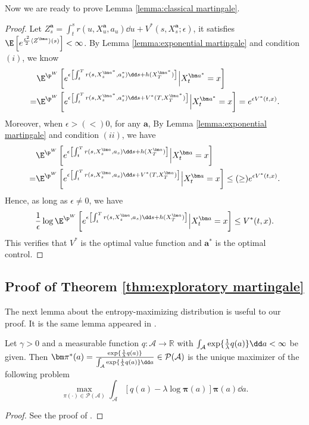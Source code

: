 Now we are ready to prove Lemma \ref{lemma:classical martingale}.
\begin{proof}
Let $Z_s^{\bm a} = \int_t^s r(u, X_{u}^{\bm a}, a_{u})\dd u+ V^*(s, X_s^{\bm a};\epsilon)$, it satisfies $\E\left[ e^{\frac{\epsilon^2}{2} \langle Z^{\bm a} \rangle(s) } \right] < \infty$. By Lemma \ref{lemma:exponential martingale} and condition $(i)$, we know
\[
\begin{aligned}
& \E^{\p^W}\left[ e^{\epsilon \left[\int_t^T r(s,X_s^{\bm a^*},a_s^*) \dd s + h(X_T^{\bm a^*}) \right]}   \Big| X_t^{\bm a^*} = x \right] \\
= & \E^{\p^W}\left[ e^{\epsilon \left[\int_t^T r(s,X_s^{\bm a^*},a_s^*) \dd s + V^*(T,X_T^{\bm a^*}) \right]}   \Big| X_t^{\bm a^*} = x \right] = e^{\epsilon V^*(t,x)}.
\end{aligned}
\]
Moreover, when $\epsilon > (<) 0$, for any $\bm a$, By Lemma \ref{lemma:exponential martingale} and condition $(ii)$, we have 
\[
\begin{aligned}
& \E^{\p^W}\left[ e^{\epsilon \left[\int_t^T r(s,X_s^{\bm a},a_s) \dd s + h(X_T^{\bm a}) \right]}   \Big| X_t^{\bm a} = x \right] \\
= & \E^{\p^W}\left[ e^{\epsilon \left[\int_t^T r(s,X_s^{\bm a},a_s) \dd s + V^*(T,X_T^{\bm a}) \right]}   \Big| X_t^{\bm a} = x \right] \leq (\geq) e^{\epsilon V^*(t,x)}.
\end{aligned}
\]
Hence, as long as $\epsilon\neq 0$, we have
\[ \frac{1}{\epsilon}\log \E^{\p^W}\left[ e^{\epsilon \left[\int_t^T r(s,X_s^{\bm a},a_s) \dd s + h(X_T^{\bm a}) \right]}   \Big| X_t^{\bm a} = x \right] \leq V^*(t,x) . \]
This verifies that $V^*$ is the optimal value function and $\bm a^*$ is the optimal control.
\end{proof}








\subsection{Proof of Theorem \ref{thm:exploratory martingale}}
The next lemma about the entropy-maximizing distribution is useful to our proof. It is the same lemma appeared in \citet[Lemma 13]{jia2022q}.
\begin{lemma}
\label{lemma:entropy max}
Let $\gamma>0$ and a measurable function $q:\mathcal{A}\to\mathbb{R}$ with $\int_{{\cal A}} \exp\{\frac{1}{\lambda}q(a)\} \dd a < \infty$ be given. Then  $\bm\pi^*(a) = \frac{\exp\{\frac{1}{\lambda}q(a)\}}{\int_{{\cal A}} \exp\{\frac{1}{\lambda}q(a)\} \dd a} \in \mathcal{P}(\mathcal{A})$ is the unique maximizer of the following problem
\begin{equation}
\label{eq:entropy max}
\max_{\pi(\cdot)\in
\mathcal{P}(\mathcal{A})}\int_{\mathcal{A}} [q(a) - \lambda\log\bm\pi(a)]\bm\pi(a)\dd a .
\end{equation}	
\end{lemma}
\begin{proof}
See the proof of \citet[Lemma 13]{jia2022q}.
\end{proof}

